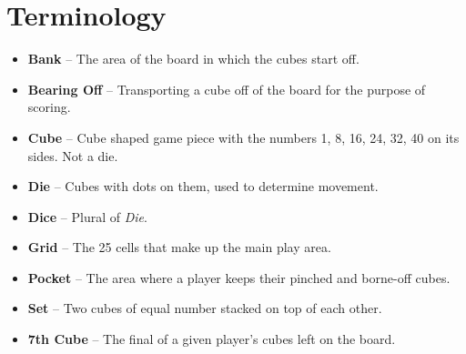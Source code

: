 \section{Terminology}
\begin{itemize}
    \item \textbf{Bank} -- The area of the board in which the cubes start off.
    \item \textbf{Bearing Off} -- Transporting a cube off of the board for the purpose of scoring.
    \item \textbf{Cube} -- Cube shaped game piece with the numbers 1, 8, 16, 24, 32, 40 on its sides. Not a die.
    \item \textbf{Die} -- Cubes with dots on them, used to determine movement.
    \item \textbf{Dice} -- Plural of \textit{Die}.
    \item \textbf{Grid} -- The 25 cells that make up the main play area.
    \item \textbf{Pocket} -- The area where a player keeps their pinched and borne-off cubes.
    \item \textbf{Set} -- Two cubes of equal number stacked on top of each other.
    \item \textbf{7th Cube} -- The final of a given player's cubes left on the board.
\end{itemize}